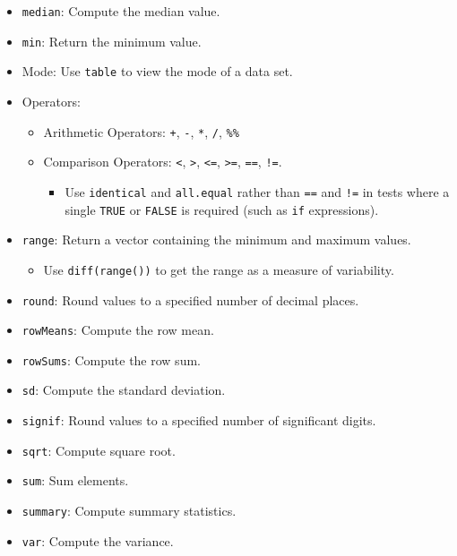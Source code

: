 \documentclass[
]{book}
\newenvironment{Shaded}{\begin{snugshade}}{\end{snugshade}}
\newcommand{\DataTypeTok}[1]{\textcolor[rgb]{0.13,0.29,0.53}{#1}}
\newcommand{\DecValTok}[1]{\textcolor[rgb]{0.00,0.00,0.81}{#1}}
\newcommand{\KeywordTok}[1]{\textcolor[rgb]{0.13,0.29,0.53}{\textbf{#1}}}
\newcommand{\NormalTok}[1]{#1}
\newcommand{\OperatorTok}[1]{\textcolor[rgb]{0.81,0.36,0.00}{\textbf{#1}}}
\newcommand{\StringTok}[1]{\textcolor[rgb]{0.31,0.60,0.02}{#1}}
\providecommand{\tightlist}{%
  \setlength{\itemsep}{0pt}\setlength{\parskip}{0pt}}
\begin{document}
\begin{Shaded}
\end{Shaded}

\begin{itemize}
\tightlist
\item
  \texttt{median}: Compute the median value.
\item
  \texttt{min}: Return the minimum value.
\item
  Mode: Use \texttt{table} to view the mode of a data set.
\item
  Operators:

  \begin{itemize}
  \tightlist
  \item
    Arithmetic Operators: \texttt{+}, \texttt{-}, \texttt{*}, \texttt{/}, \texttt{\%\%}
  \item
    Comparison Operators: \texttt{\textless{}}, \texttt{\textgreater{}}, \texttt{\textless{}=}, \texttt{\textgreater{}=}, \texttt{==}, \texttt{!=}.

    \begin{itemize}
    \tightlist
    \item
      Use \texttt{identical} and \texttt{all.equal} rather than \texttt{==} and \texttt{!=} in tests where a single \texttt{TRUE} or \texttt{FALSE} is required (such as \texttt{if} expressions).
    \end{itemize}
  \end{itemize}
\item
  \texttt{range}: Return a vector containing the minimum and maximum values.

  \begin{itemize}
  \tightlist
  \item
    Use \texttt{diff(range())} to get the range as a measure of variability.
  \end{itemize}
\item
  \texttt{round}: Round values to a specified number of decimal places.
\item
  \texttt{rowMeans}: Compute the row mean.
\item
  \texttt{rowSums}: Compute the row sum.
\item
  \texttt{sd}: Compute the standard deviation.
\item
  \texttt{signif}: Round values to a specified number of significant digits.
\item
  \texttt{sqrt}: Compute square root.
\item
  \texttt{sum}: Sum elements.
\item
  \texttt{summary}: Compute summary statistics.
\item
  \texttt{var}: Compute the variance.
\end{itemize}
\end{document}
